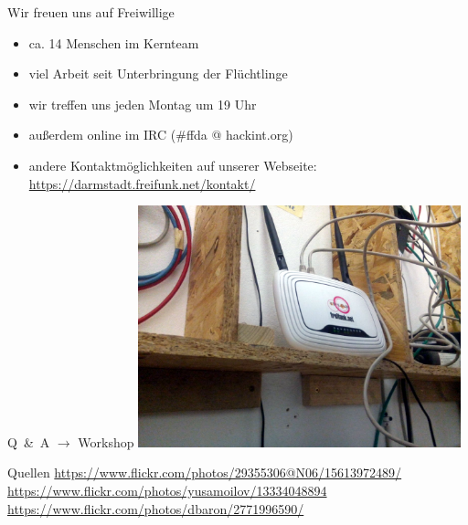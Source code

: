 \documentclass[10pt]{beamer}
\begin{document}
\begin{frame}{Wir freuen uns auf Freiwillige}
	\begin{itemize}
		\item ca. 14 Menschen im Kernteam	
		\item viel Arbeit seit Unterbringung der Flüchtlinge
		\vfill
		\pause
		\item wir treffen uns jeden Montag um 19 Uhr
		\item außerdem online im IRC (\#ffda @ hackint.org)
		\item andere Kontaktmöglichkeiten auf unserer Webseite:\\
		\url{https://darmstadt.freifunk.net/kontakt/}
	\end{itemize}
\end{frame}

\begin{frame}{Q~\&~A $\rightarrow$ Workshop}
\vfill
\centering
\includegraphics[width=0.7\textwidth]{images/irl_router}
\vfill
\end{frame}

\begin{frame}{Quellen}
\url{https://www.flickr.com/photos/29355306@N06/15613972489/}\\
\url{https://www.flickr.com/photos/yusamoilov/13334048894}\\
\url{https://www.flickr.com/photos/dbaron/2771996590/}
\end{frame}
\end{document}
